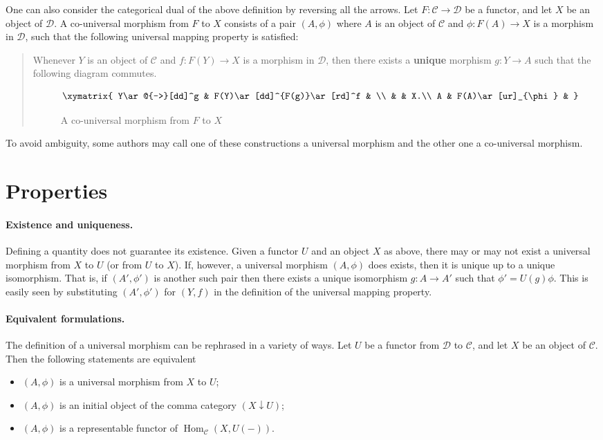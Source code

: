 \documentclass[12pt]{article}
\newcommand{\Hom}{\operatorname{Hom}}
\begin{document}
One can also consider the categorical dual of the above definition by
reversing all the arrows. Let $F:\mathcal{C}\to \mathcal{D}$ be a functor, and let $X$
be an object of $\mathcal{D}$. A
co-universal morphism from $F$ to $X$ consists of a pair $(A, \phi)$
where $A$ is an object of $\mathcal{C}$ and $\phi:F(A) \to X$ is a
morphism in $\mathcal{D}$, such that the following universal mapping property is
satisfied:
\begin{quote}
  Whenever $Y$ is an object of $\mathcal{C}$ and $f \colon F(Y) \to X$ is a morphism
  in $\mathcal{D}$, then there exists a \textbf{unique} morphism $g \colon Y \to A$
  such that the following diagram commutes.
  \begin{figure}[h]
    \centering
    \[\xymatrix{
 		 Y\ar@{-->}[dd]^g & F(Y)\ar[dd]^{F(g)}\ar[rd]^f & \\
 		   &      &  X.\\
 		 A & F(A)\ar[ur]_{\phi} &     
    }\]
    \caption{A co-universal morphism from $F$ to $X$}
  \end{figure}
\end{quote}
To avoid ambiguity, some authors may call one of these constructions a
universal morphism and the other one a co-universal morphism.

\section{Properties}

\paragraph{Existence and uniqueness.}
Defining a quantity does not guarantee its existence. Given a functor
$U$ and an object $X$ as above, there may or may not exist a universal
morphism from $X$ to $U$ (or from $U$ to $X$). If, however, a universal
morphism $(A, \phi)$ does exists, then it is unique up to a unique
isomorphism. That is, if $(A', \phi')$ is another such pair
then there exists a unique isomorphism $g \colon A \to A'$ such
that $\phi' = U(g)\phi$. This is easily seen by substituting
$(A', \phi')$ for $(Y, f)$ in the definition of the universal mapping
property.

\paragraph{Equivalent formulations.}
The definition of a universal morphism can be rephrased in a variety
of ways. Let $U$ be a functor from $\mathcal{D}$ to $\mathcal{C}$, and let $X$ be
an object of $\mathcal{C}$. Then the following statements are equivalent
\begin{itemize}
\item $(A, \phi)$ is a universal morphism from $X$ to $U$;
\item $(A, \phi)$ is an initial object of the comma category $(X
  \downarrow U)$;
\item $(A, \phi)$ is
  a representable functor of $\Hom_{\mathcal{C}}(X,U(-))$.
\end{itemize}
\end{document}
